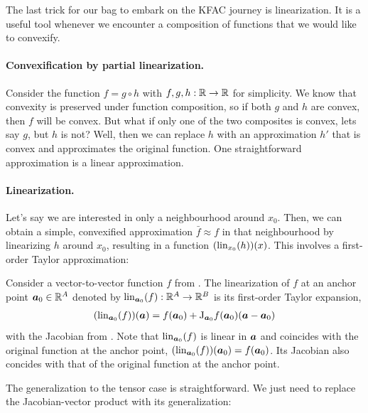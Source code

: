 The last trick for our bag to embark on the KFAC journey is linearization.
It is a useful tool whenever we encounter a composition of functions that we would like to convexify.

\paragraph{Convexification by partial linearization.}
Consider \eg the function $f = g \circ h$ with $f,g,h: {\mathbb{R}} \to {\mathbb{R}}$ for simplicity.
We know that convexity is preserved under function composition, so if both $g$ and $h$ are convex, then $f$ will be convex.
But what if only one of the two composites is convex, lets say $g$, but $h$ is not?
Well, then we can replace $h$ with an approximation $h'$ that is convex and approximates the original function.
One straightforward approximation is a linear approximation.

\paragraph{Linearization.} Let's say we are interested in only a neighbourhood around $x_0$.
Then, we can obtain a simple, convexified approximation $\bar{f} \approx f$ in that neighbourhood by linearizing $h$ around $x_0$, resulting in a function $(\operatorname{lin}_{x_0}(h))(x)$.
This involves a first-order Taylor approximation:

\begin{definition}\label{def:vector_linearization}
  Consider a vector-to-vector function $f$ from .
  The linearization of $f$ at an anchor point ${\bm{a}}_0 \in {\mathbb{R}}^A$ denoted by $\operatorname{lin}_{{\bm{a}}_0}(f): {\mathbb{R}}^A \to {\mathbb{R}}^B$ is its first-order Taylor expansion,
  \begin{align*}
    (\operatorname{lin}_{{\bm{a}}_0}(f))({\bm{a}}) = f({\bm{a}}_0) + \mathrm{J}_{{\bm{a}}_0}f({\bm{a}}_0) ({\bm{a}} - {\bm{a}}_0)
  \end{align*}
  with the Jacobian from .
  Note that $\operatorname{lin}_{{\bm{a}}_0}(f)$ is linear in ${\bm{a}}$ and coincides with the original function at the anchor point, $(\operatorname{lin}_{{\bm{a}}_0}(f))({\bm{a}}_0) = f({\bm{a}}_0)$.
  Its Jacobian also concides with that of the original function at the anchor point.
\end{definition}

The generalization to the tensor case is straightforward.
We just need to replace the Jacobian-vector product with its generalization:

\switchcolumn[1]
\switchcolumn[0]

